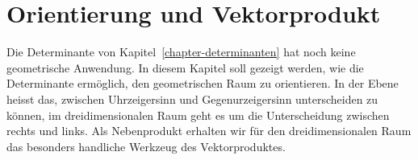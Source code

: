 %
%
%
\chapter{Orientierung und Vektorprodukt\label{chapter:orientierung}}
\rhead{}
Die Determinante von Kapitel~\ref{chapter-determinanten} hat noch
keine geometrische Anwendung.
In diesem Kapitel soll gezeigt werden, wie die Determinante ermöglich,
den geometrischen Raum zu orientieren.
In der Ebene heisst das, zwischen Uhrzeigersinn und Gegenurzeigersinn
unterscheiden zu können, im dreidimensionalen Raum geht es um die
Unterscheidung zwischen rechts und links.
Als Nebenprodukt erhalten wir für den dreidimensionalen Raum das
besonders handliche Werkzeug des Vektorproduktes.

%




